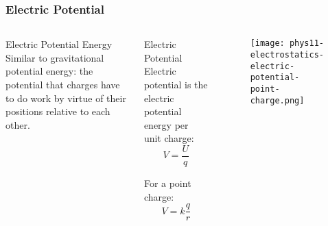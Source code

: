\documentclass{beamer}
\begin{document}
\begin{frame}
    \frametitle{Electric Potential}
    \begin{columns}
        \begin{block}{Electric Potential Energy}
            Similar to gravitational potential energy: the potential that charges have to do work by virtue of their positions relative to each other.
        \end{block}
        
        \begin{block}{Electric Potential}
            Electric potential is the electric potential energy per unit charge:
            \begin{equation}
                V = \frac{U}{q}
            \end{equation}
            
            For a point charge:
            \begin{equation}
                V = k\frac{q}{r}
            \end{equation}
        \end{block}
        
        \begin{alertblock}{ }
            \begin{figure}
                \centering
                \texttt{[image: phys11-electrostatics-electric-potential-point-charge.png]}
            \end{figure}
        \end{alertblock}
    \end{columns}
\end{frame}
\end{document}
